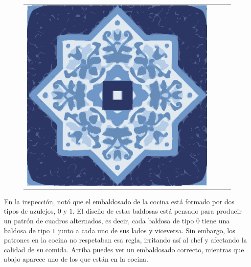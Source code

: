 \documentclass{oci}
\begin{document}
\begin{problemDescription}
\begin{figure}[h]
\begin{center}
{\begin{tabular}{cccc}
        \includegraphics[scale=0.3]{a.eps}
      \end{tabular}
    }
  \end{center}
\end{figure}

En la inspección, notó que el embaldosado de la cocina está formado por dos tipos de azulejos, $0$ y $1$.
El diseño de estas baldosas está pensado para producir un patrón de cuadros alternados, es decir, cada baldosa de tipo $0$ tiene una baldosa de tipo $1$ junto a cada uno de sus lados y viceversa.
Sin embargo, los patrones en la cocina no respetaban esa regla, irritando así al chef y afectando la calidad de su comida.
Arriba puedes ver un embaldosado correcto, mientras que abajo aparece uno de los que están en la cocina.


\end{problemDescription}
\end{document}
